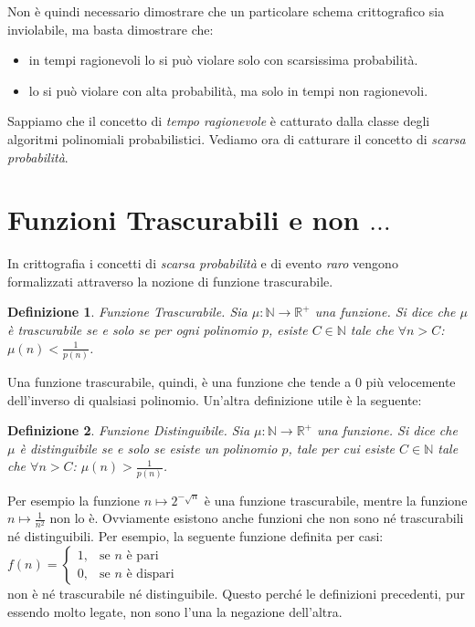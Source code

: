 \documentclass[a4paper,openright,twoside,12pt]{report}
\newtheorem{definizione}{Definizione}[chapter]
\begin{document}
Non \`e quindi necessario dimostrare che un particolare schema crittografico sia inviolabile, ma basta dimostrare che:
\begin{itemize}
 \item in tempi ragionevoli lo si pu\`o violare solo con scarsissima probabilit\`a.
 \item lo si pu\`o violare con alta probabilit\`a, ma solo in tempi non ragionevoli.
\end{itemize}
Sappiamo che il concetto di \emph{tempo ragionevole} \`e catturato dalla classe degli algoritmi polinomiali probabilistici. Vediamo ora di catturare il concetto di \emph{scarsa probabilit\`a}.
\section{Funzioni Trascurabili e non $\dots$}
In crittografia i concetti di \emph{scarsa probabilit\`a} e di evento \emph{raro} vengono formalizzati attraverso la nozione di funzione trascurabile.
\begin{definizione}{Funzione Trascurabile.}
Sia $\mu: \mathbb{N} \rightarrow \mathbb{R^{+}}$ una funzione. Si dice che $\mu$ \`e trascurabile se e solo se per ogni polinomio $p$, esiste $C \in \mathbb{N} $ tale che $\forall n>C$: $\mu(n) < \frac{1}{p(n)}$.  
\end{definizione}
Una funzione trascurabile, quindi, \`e una funzione che tende a 0 pi\`u velocemente dell'inverso di qualsiasi polinomio.
Un'altra definizione utile \`e la seguente:
\begin{definizione}{Funzione Distinguibile.}
Sia $\mu: \mathbb{N} \rightarrow \mathbb{R^{+}}$ una funzione. Si dice che $\mu$ \`e distinguibile se e solo se esiste un polinomio $p$, tale per cui esiste $C \in \mathbb{N} $ tale che $\forall n>C$: $\mu(n) > \frac{1}{p(n)}$.  
\end{definizione}
Per esempio la funzione $n  \mapsto 2^{-\sqrt{n}}$ \`e una funzione trascurabile, mentre la funzione $n \mapsto \frac{1}{n^2}$ non lo \`e. 
Ovviamente esistono anche funzioni che non sono n\'e trascurabili n\'e distinguibili. Per esempio, la seguente funzione definita per casi:\\
$f(n) = \begin{cases} 1, & \mbox{se } n\mbox{ \`e pari} \\ 0, & \mbox{se } n\mbox{ \`e dispari} \end{cases}$\\
non \`e n\'e trascurabile n\'e distinguibile. Questo perch\'e le definizioni precedenti, pur essendo molto legate, non sono l'una la negazione dell'altra.
\end{document}
